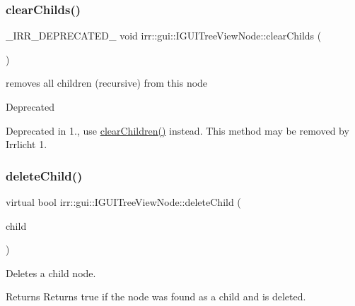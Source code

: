 \subsubsection{\texorpdfstring{clear\+Childs()}{clearChilds()}}
{\footnotesize\ttfamily \+\_\+\+I\+R\+R\+\_\+\+D\+E\+P\+R\+E\+C\+A\+T\+E\+D\+\_\+ void irr\+::gui\+::\+I\+G\+U\+I\+Tree\+View\+Node\+::clear\+Childs (\begin{DoxyParamCaption}{ }\end{DoxyParamCaption})\hspace{0.3cm}{\ttfamily [inline]}}



removes all children (recursive) from this node 

\begin{DoxyRefDesc}{Deprecated}
\item[\hyperlink{deprecated__deprecated000007}{Deprecated}]Deprecated in 1., use \hyperlink{classirr_1_1gui_1_1IGUITreeViewNode_a0bc4702930d1ddb25b895c7176f5f459}{clear\+Children()} instead. This method may be removed by Irrlicht 1. \end{DoxyRefDesc}
\mbox{\label{classirr_1_1gui_1_1IGUITreeViewNode_a26d0ce5bc0a6e7814f69d68033c30242}} 
\subsubsection{\texorpdfstring{delete\+Child()}{deleteChild()}}
{\footnotesize\ttfamily virtual bool irr\+::gui\+::\+I\+G\+U\+I\+Tree\+View\+Node\+::delete\+Child (\begin{DoxyParamCaption}\item[{\hyperlink{classirr_1_1gui_1_1IGUITreeViewNode}{I\+G\+U\+I\+Tree\+View\+Node} $\ast$}]{child }\end{DoxyParamCaption})\hspace{0.3cm}{\ttfamily [pure virtual]}}



Deletes a child node. 

\begin{DoxyReturn}{Returns}
Returns true if the node was found as a child and is deleted. 
\end{DoxyReturn}
\mbox{\label{classirr_1_1gui_1_1IGUITreeViewNode_a33cbd8c146ec27a4812548a32d81732b}} 
